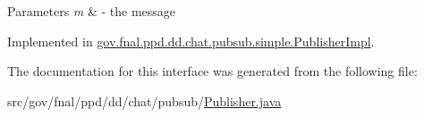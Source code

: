 \begin{DoxyParams}{Parameters}
{\em m} & -\/ the message \\
\hline
\end{DoxyParams}


Implemented in \hyperlink{classgov_1_1fnal_1_1ppd_1_1dd_1_1chat_1_1pubsub_1_1simple_1_1PublisherImpl_a0f1bd92c6c0a4768252010e72a4ce718}{gov.\-fnal.\-ppd.\-dd.\-chat.\-pubsub.\-simple.\-Publisher\-Impl}.



The documentation for this interface was generated from the following file\-:\begin{DoxyCompactItemize}
\item 
src/gov/fnal/ppd/dd/chat/pubsub/\hyperlink{Publisher_8java}{Publisher.\-java}\end{DoxyCompactItemize}
